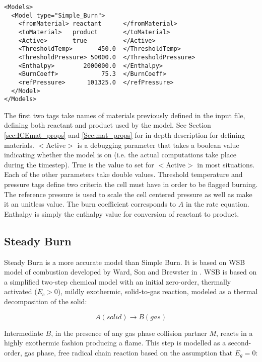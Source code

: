 \begin{lstlisting}
<Models>
  <Model type="Simple_Burn">
    <fromMaterial> reactant      </fromMaterial>
    <toMaterial>   product       </toMaterial>
    <Active>       true          </Active>
    <ThresholdTemp>       450.0  </ThresholdTemp>
    <ThresholdPressure> 50000.0  </ThresholdPressure>
    <Enthalpy>        2000000.0  </Enthalpy>
    <BurnCoeff>            75.3  </BurnCoeff>
    <refPressure>      101325.0  </refPressure>
  </Model>
</Models>
\end{lstlisting}

The first two tags take names of materials previously defined in the input file, defining both reactant and product used by the model.  See Section \ref{sec:ICEmat_props} and \ref{Sec:mat_props} for in depth description for defining materials.  $<$Active$>$ is a debugging parameter that takes a boolean value indicating whether the model is on (i.e. the actual computations take place during the timestep).  True is the value to set for $<$Active$>$ in most situations.  Each of the other parameters take double values.  Threshold temperature and pressure tags define two criteria the cell must have in order to be flagged burning.  The reference pressure is used to scale the cell centered pressure as well as make it an unitless value.  The burn coefficient corresponds to $A$ in the rate equation.  Enthalpy is simply the enthalpy value for conversion of reactant to product.
\newpage
\subsection{Steady Burn} \label{Sec:SteadyBurn}

Steady Burn is a more accurate model than Simple Burn.  It is based on WSB model of combustion developed by Ward, Son and Brewster in \cite{ref:wardsonbrewster}.  WSB is based on a simplified two-step chemical model with an initial zero-order, thermally activated ($E_c > 0$), mildly exothermic, solid-to-gas reaction, modeled as a thermal decomposition of the solid:

\begin{equation}
A(solid)\rightarrow B(gas)
\end{equation}

Intermediate $B$, in the presence of any gas phase collision partner $M$, reacts in a highly exothermic fashion producing a flame.  This step is modelled as a second-order, gas phase, free radical chain reaction based on the assumption that $E_g = 0$:

